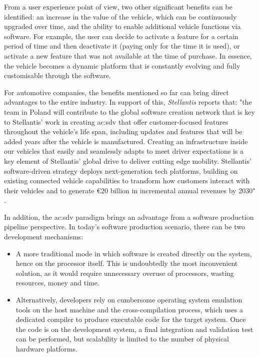 From a user experience point of view, two other significant benefits can be identified: an increase in the value of the vehicle, which can be continuously upgraded over time, and the ability to enable additional vehicle functions via software. For example, the user can decide to activate a feature for a certain period of time and then deactivate it (paying only for the time it is used), or activate a new feature that was not available at the time of purchase. In essence, the vehicle becomes a dynamic platform that is constantly evolving and fully customisable through the software.

For automotive companies, the benefits mentioned so far can bring direct advantages to the entire industry. In support of this, \textit{Stellantis} reports that: "the team in Poland will contribute to the global software creation network that is key to Stellantis' work in creating \gls{ac:sdv} that offer customer-focused features throughout the vehicle's life span, including updates and features that will be added years after the vehicle is manufactured. Creating an infrastructure inside our vehicles that easily and seamlessly adapts to meet driver expectations is a key element of Stellantis' global drive to deliver cutting edge mobility. Stellantis' software-driven strategy deploys next-generation tech platforms, building on existing connected vehicle capabilities to transform how customers interact with their vehicles and to generate €20 billion in incremental annual revenues by 2030" \cite{StellantisSDV}.

In addition, the \gls{ac:sdv} paradigm brings an advantage from a software production pipeline perspective. In today's software production scenario, there can be two development mechanisms:
\begin{itemize}
    \item A more traditional mode in which software is created directly on the system, hence on the processor itself. This is undoubtedly the most inconvenient solution, as it would require unnecessary overuse of processors, wasting resources, money and time.
    \item Alternatively, developers rely on cumbersome operating system emulation tools on the host machine and the cross-compilation process, which uses a dedicated compiler to produce executable code for the target system. Once the code is on the development system, a final integration and validation test can be performed, but scalability is limited to the number of physical hardware platforms. 
\end{itemize}

